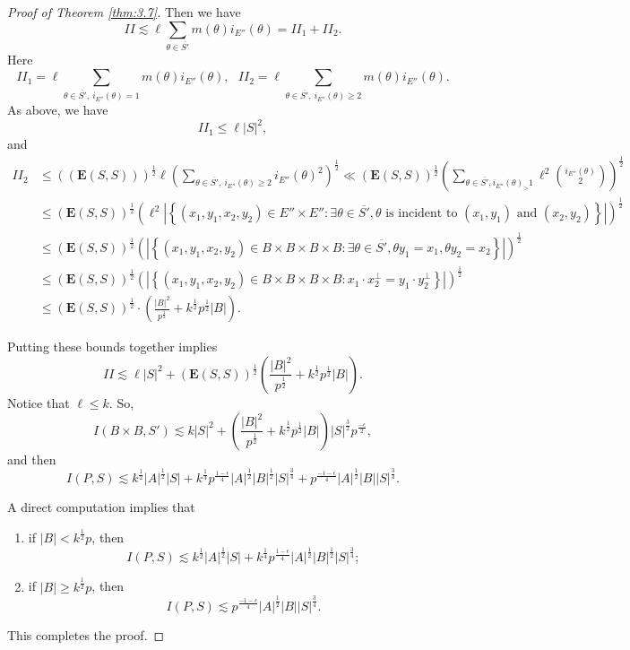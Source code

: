 \documentclass[11pt]{article}
\def\Fbb{\mathbb{F}}
\def\Ebf{\textbf{E}}
\def\l({\left(}
\def\r){\right)}
\def\lv{\left\vert}
\def\rv{\right\vert}
\def\lo{\left\{}
\def\ro{\right\}}
\begin{document}
\begin{proof}[Proof of Theorem \ref{thm:3.7}]
Then we have 
\[II \lesssim \ell\sum_{\theta\in \overline{S'}}m(\theta)i_{E''}(\theta)=II_1+II_2.\]
Here 
\[II_1=\ell\sum_{\theta\in \overline{S'}, ~i_{E''}(\theta)=1}m(\theta)i_{E''}(\theta),~~~II_2=\ell\sum_{\theta\in \overline{S'}, ~i_{E''}(\theta)\ge 2}m(\theta)i_{E''}(\theta).\]
As above, we have 
\[II_1\le \ell |S|^2,\]
and 
\begin{align*}
    II_2 & \le \l( (\Ebf (S,S)) \r)^{\frac{1}{2}} \ell \l( \sum_{\theta\in \overline{S'}, ~i_{E''}(\theta)\ge 2} i_{E''}(\theta)^2 \r) ^{\frac{1}{2}}  \ll \l( \Ebf (S,S) \r)^\frac{1}{2} \l( \sum_{\theta \in\overline{S'},i_{E''}(\theta )_>1} \ell^2 \binom{i_{E''}(\theta)}{2} \r)^{\frac{1}{2}} \\
    & \le \l( \Ebf (S,S) \r)^\frac{1}{2} \l( \ell^2 \lv \lo  (x_1,y_1,x_2,y_2) \in E''\times E''\colon \exists \theta \in \overline{S'} , \theta \text{ is incident to $(x_1,y_1)$ and $(x_2,y_2)$} \ro \rv \r)^{\frac{1}{2}} \\
    & \le \l( \Ebf (S,S) \r)^\frac{1}{2} \l( \lv \lo  (x_1,y_1,x_2,y_2) \in B\times B \times B \times B\colon \exists \theta \in \overline{S'} , \theta y_1=x_1 ,\theta y_2 =x_2 \ro \rv \r)^{\frac{1}{2}} \\
    & \le \l( \Ebf (S,S) \r)^\frac{1}{2} \l( \lv \lo \l( x_1,y_1,x_2,y_2\r) \in B\times B \times B \times B \colon x_1\cdot x_2^\perp =y_1 \cdot y_2^\perp \ro \rv \r)^{\frac{1}{2}} \\
    & \le (\Ebf (S,S))^{\frac{1}{2}} \cdot \l( \frac{|B|^2}{p^{\frac{1}{2}}} + k^{\frac{1}{2}}p^{\frac{1}{2}}|B| \r) .
\end{align*} 


Putting these bounds together implies 
\[II\lesssim \ell |S|^2+ (\Ebf (S,S))^{\frac{1}{2}} \l( \frac{|B|^2}{p^{\frac{1}{2}}} + k^{\frac{1}{2}}p^{\frac{1}{2}}|B| \r).\]
Notice that $\ell\le k$. So,
\[I(B\times B, S')\lesssim  k|S|^2+\l( \frac{|B|^2}{p^{\frac{1}{2}}} + k^{\frac{1}{2}}p^{\frac{1}{2}}|B| \r) |S|^{\frac{3}{2}}p^{\frac{-\epsilon}{2}},\]
and then
\[ I(P,S) \lesssim k^{\frac{1}{2}}|A|^{\frac{1}{2}} |S| + k^{\frac{1}{4}} p^{\frac{1-\epsilon}{4}} |A|^{\frac{1}{2}} |B|^{\frac{1}{2}} |S|^{\frac{3}{4}} + p^{\frac{-1-\epsilon}{4}}|A|^{\frac{1}{2}}|B||S|^{\frac{3}{4}} .\]

A direct computation implies that
\begin{enumerate}
    \item if $|B|< k^{\frac{1}{2}}p$, then
    \[ I(P,S) \lesssim k^{\frac{1}{2}}|A|^{\frac{1}{2}} |S| + k^{\frac{1}{4}} p^{\frac{1-\epsilon}{4}} |A|^{\frac{1}{2}} |B|^{\frac{1}{2}} |S|^{\frac{3}{4}} ;\]
    \item if $|B| \ge k^{\frac{1}{2}}p$, then
    \[ I(P,S) \lesssim  p^{\frac{-1-\epsilon}{4}}|A|^{\frac{1}{2}}|B||S|^{\frac{3}{4}}.\]
\end{enumerate}
This completes the proof.
\end{proof}
\end{document}
